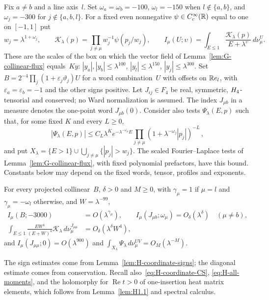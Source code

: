 Fix $a\ne b$ and a line axis~$l$. Set $\omega_a=\omega_b=-100$, $\omega_l=-150$ when $l\notin\{a,b\}$, and $\omega_j=-300$ for $j\notin\{a,b,l\}$. For a fixed even nonnegative $\psi\in C_c^\infty(\mathbb{R})$ equal to one on $[-1,1]$ put
\begin{equation*}
w_j=\lambda^{1+\omega_j},\qquad \mathcal K_\lambda(p)=\prod_{j\ne\mu}w_j^{-1}\psi(p_j/w_j),\qquad
I_\mu(U;\upsilon)=\int_{E\le1}\frac{\mathcal K_\lambda(p)}{E+\lambda^\upsilon}\,d\nu_\mu^U.
\end{equation*}
These are the scales of the box on which the vector field of Lemma~\ref{lem:G-collinear-flux} equals~$Ky$: $|y_a|,|y_b|\le\lambda^{100}$, $|y_l|\le\lambda^{150}$, $|y_j|\le\lambda^{300}$. Set $B=2^{-4}\prod_j(1+\varepsilon_j\vartheta_j)U$ for a word combination~$U$ with offsets on $\mathbb{R} e_l$, with $\varepsilon_a=\varepsilon_b=-1$ and the other signs positive. Let $J_{ij}\in F_4$ be real, symmetric, $H_4$-tensorial and conserved; no Ward normalization is assumed. The index $J_{\mu b}$ in a measure denotes the one-point word $J_{\mu b}(0)$. Consider also tests $\Psi_\lambda(E,p)$ such that, for some fixed $K$ and every $L\ge0$,
\begin{equation}\label{eq:H-scaled-tests}
|\Psi_\lambda(E,p)|\le C_L\lambda^K e^{-\lambda^{-\omega_\mu}E}
\prod_{j\ne\mu}(1+\lambda^{-\omega_j}|p_j|)^{-L}\,,
\end{equation}
and put $X_\lambda=\{E>1\}\cup\bigcup_{j\ne\mu}\{|p_j|>w_j\}$. The scaled Fourier--Laplace tests of Lemma~\ref{lem:G-collinear-flux}, with fixed polynomial prefactors, have this bound. Constants below may depend on the fixed words, tensor, profiles and exponents.
\begin{lemma}\label{lem:H-G3}
For every projected collinear~$B$, $\delta>0$ and $M\ge0$, with $\gamma_\mu=1$ if $\mu=l$ and $\gamma_\mu=-\omega_l$ otherwise, and $W=\lambda^{-99}$,
\begin{align}
I_\mu(B;-3000)&=O(\lambda^{\gamma_\mu}),\qquad
I_\mu(J_{\mu b};\omega_\mu)=O_\delta(\lambda^\delta)\quad(\mu\ne b),\label{eq:G-spectral-input}\\
\int_{E\le1}\frac{EW^4}{(E+W)^4}\mathcal K_\lambda\,d\nu_\mu^{J_{\mu\mu}}&=O_\delta(\lambda^\delta W^4),\label{eq:G-mass-input}
\end{align}
and $I_\mu(J_{\mu\mu};0)=O(\lambda^{900})$ and $\int_{X_\lambda}\Psi_\lambda\,d\nu_\mu^{UV}=O_M(\lambda^{-M})$.
\end{lemma}
The sign estimates come from Lemma~\ref{lem:H-coordinate-signs}; the diagonal estimate comes from conservation. Recall also~\eqref{eq:H-coordinate-CS}, \eqref{eq:H-all-moments}, and the holomorphy for $\operatorname{Re}t>0$ of one-insertion heat matrix elements, which follows from Lemma~\ref{lem:H1.1} and spectral calculus.
